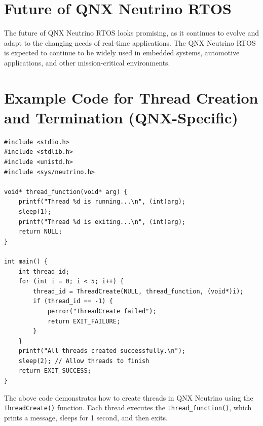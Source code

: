 \documentclass{article}
\begin{document}
\section{Future of QNX Neutrino RTOS}
\label{sec:future-qnx}
The future of QNX Neutrino RTOS looks promising, as it continues to evolve and adapt to the changing needs of real-time applications.
The QNX Neutrino RTOS is expected to continue to be widely used in embedded systems, automotive applications, and other mission-critical environments.

\section{Example Code for Thread Creation and Termination (QNX-Specific)}
\label{sec:example-code-threadcreate}
\begin{verbatim}
#include <stdio.h>
#include <stdlib.h>
#include <unistd.h>
#include <sys/neutrino.h>

void* thread_function(void* arg) {
    printf("Thread %d is running...\n", (int)arg);
    sleep(1);
    printf("Thread %d is exiting...\n", (int)arg);
    return NULL;
}

int main() {
    int thread_id;
    for (int i = 0; i < 5; i++) {
        thread_id = ThreadCreate(NULL, thread_function, (void*)i);
        if (thread_id == -1) {
            perror("ThreadCreate failed");
            return EXIT_FAILURE;
        }
    }
    printf("All threads created successfully.\n");
    sleep(2); // Allow threads to finish
    return EXIT_SUCCESS;
}
\end{verbatim}
The above code demonstrates how to create threads in QNX Neutrino using the \texttt{ThreadCreate()} function.
Each thread executes the \texttt{thread\_function()}, which prints a message, sleeps for 1 second, and then exits.
\end{document}

